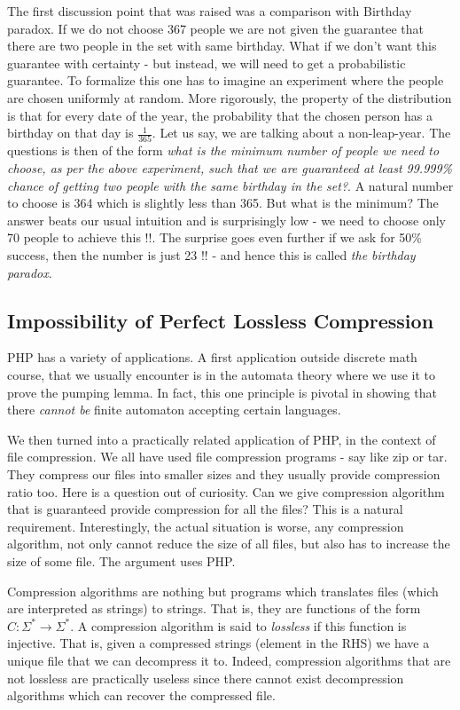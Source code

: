 The first discussion point that was raised was a comparison with Birthday paradox. If we do not choose 367 people we are not given the guarantee that there are two people in the set with same birthday. What if we don't want this guarantee with certainty - but instead, we will need to get a probabilistic guarantee. To formalize this one has to imagine an experiment where the people are chosen uniformly at random. More rigorously, the property of the distribution is that for every date of the year, the probability that the chosen person has a birthday on that day is $\frac{1}{365}$. Let us say, we are talking about a non-leap-year. The questions is then of the form {\em what is the minimum number of people we need to choose, as per the above experiment, such that we are guaranteed at least 99.999\% chance of getting two people with the same birthday in the set?}. A natural number to choose is 364 which is slightly less than 365. But what is the minimum? The answer beats our usual intuition and is surprisingly low - we need to choose only 70 people to achieve this !!. The surprise goes even further if we ask for 50\% success, then the number is just 23 !! - and hence this is called \textit{the birthday paradox}.

\subsection{Impossibility of Perfect Lossless Compression}

PHP has a variety of applications. A first application outside discrete math course, that we usually encounter is in the automata theory where we use it to prove the pumping lemma. In fact, this one principle is pivotal in showing that there {\em cannot be} finite automaton accepting certain languages.

We then turned into a practically related application of PHP, in the context of file compression. We all have used file compression programs - say like zip or tar. They compress our files into smaller sizes and they usually provide compression ratio too. Here is a question out of curiosity. Can we give compression algorithm that is guaranteed provide compression for all the files? This is a natural requirement. Interestingly, the actual situation is worse, any compression algorithm, not only cannot reduce the size of all files, but also has to increase the size of some file. The argument uses PHP. 

Compression algorithms are nothing but programs which translates files (which are interpreted as strings) to strings. That is, they are functions of the form $C : \Sigma^* \to \Sigma^*$. A compression algorithm is said to {\em lossless} if this function is injective. That is, given a compressed strings (element in the RHS) we have a unique file that we can decompress it to. Indeed, compression algorithms that are not lossless are practically useless since there cannot exist decompression algorithms which can recover the compressed file.

